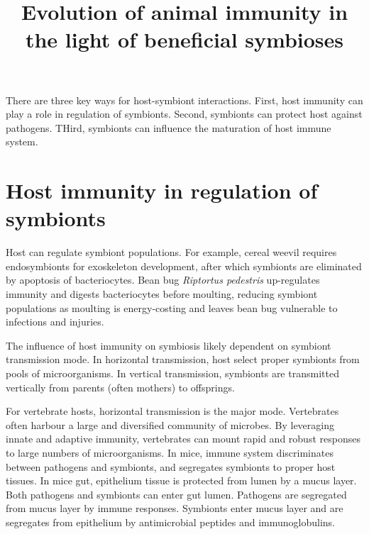 \documentclass[11pt]{article}
\title{Evolution of animal immunity in the light of beneficial symbioses}
\author{}
\date{}
\begin{document}
\begin{sloppypar}
  \maketitle

  \linenumbers
There are three key ways for host-symbiont interactions. 
First, host immunity can play a role in regulation of symbionts. 
Second, symbionts can protect host against pathogens. 
THird, symbionts can influence the maturation of host immune system. 

\section*{Host immunity in regulation of symbionts}
Host can regulate symbiont populations. 
For example, cereal weevil requires endosymbionts for exoskeleton development, after which symbionts are eliminated by apoptosis of bacteriocytes. 
Bean bug \textit{Riptortus pedestris} up-regulates immunity and digests bacteriocytes before moulting, reducing symbiont populations as moulting is energy-costing and leaves bean bug vulnerable to infections and injuries. 

\par

The influence of host immunity on symbiosis likely dependent on symbiont transmission mode. 
In horizontal transmission, host select proper symbionts from pools of microorganisms. 
In vertical transmission, symbionts are transmitted vertically from parents (often mothers) to offsprings. 

\par

For vertebrate hosts, horizontal transmission is the major mode. 
Vertebrates often harbour a large and diversified community of microbes. 
By leveraging innate and adaptive immunity, vertebrates can mount rapid and robust responses to large numbers of microorganisms. 
In mice, immune system discriminates between pathogens and symbionts, and segregates symbionts to proper host tissues. 
In mice gut, epithelium tissue is protected from lumen by a mucus layer. 
Both pathogens and symbionts can enter gut lumen. 
Pathogens are segregated from mucus layer by immune responses. 
Symbionts enter mucus layer and are segregates from epithelium by antimicrobial peptides and immunoglobulins. 

\par


\end{sloppypar}
\end{document}
